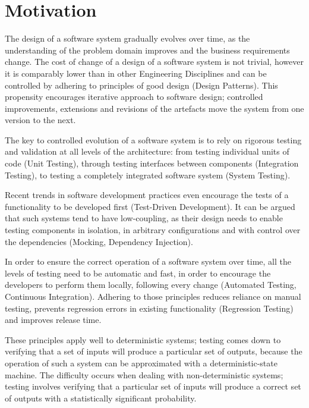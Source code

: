 \section{Motivation}


The design of a software system gradually evolves over time, as the understanding of the problem domain improves and the business requirements change. The cost of change of a design of a software system  is not trivial, however it is comparably lower than in other Engineering Disciplines and can be controlled by adhering to principles of good design (Design Patterns). This propensity encourages iterative approach to software design; controlled improvements, extensions and revisions of the artefacts move the system from one version to the next. 

The key to controlled evolution of a software system is to rely on rigorous testing and validation at all levels of the architecture: from testing individual units of code (Unit Testing), through testing interfaces between components (Integration Testing), to testing a completely integrated software system (System Testing). 

Recent trends in software development practices even encourage the tests of a functionality to be developed first (Test-Driven Development). It can be argued that such systems tend to have low-coupling, as their design needs to enable testing components in isolation, in arbitrary configurations and with control over the dependencies (Mocking, Dependency Injection).

In order to ensure the correct operation of a software system over time, all the levels of testing need to be automatic and fast, in order to encourage the developers to perform them locally, following every change (Automated Testing, Continuous Integration). Adhering to those principles reduces reliance on manual testing, prevents regression errors in existing functionality (Regression Testing) and improves release time.

These principles apply well to deterministic systems; testing comes down to verifying that a set of inputs will produce a particular set of outputs, because the operation of such a system can be approximated with a deterministic-state machine. The difficulty occurs when dealing with non-deterministic systems; testing involves verifying that a particular set of inputs will produce a correct set of outputs with a statistically significant probability.


